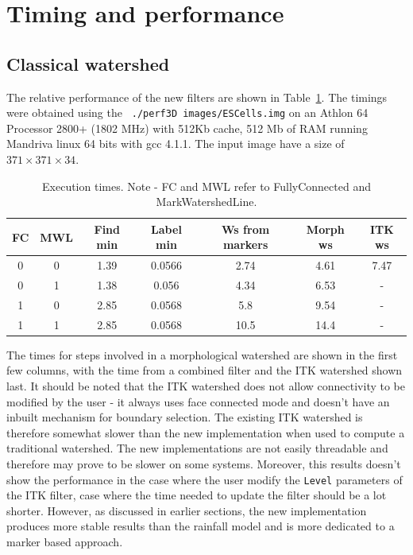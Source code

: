 \documentclass{InsightArticle}
\begin{document}
\section{Timing and performance}
\label{sect:perf}

  \subsection{Classical watershed}
\label{sect:perf-classical}

The relative performance of the new filters are shown in
Table~\ref{tbl:perf}. The timings were obtained using the {\tt
./perf3D images/ESCells.img} on an Athlon 64 
Processor 2800+ (1802 MHz) with 512Kb cache, 512 Mb of RAM running
Mandriva linux 64 bits with gcc 4.1.1. The input image have a size of
$371 \times 371 \times 34$.

\begin{table}[htbp]
\centering
\begin{tabular}{cc|ccc|cc}
\hline
FC & MWL & Find min &  Label min & Ws from markers & Morph ws &  ITK ws \\
\hline
\hline
0 &      0 &      1.39 &   0.0566 & 2.74 &   4.61 &   7.47 \\
0 &      1 &      1.38 &   0.056  & 4.34 &   6.53 &   - \\
1 &      0 &      2.85 &   0.0568 & 5.8  &   9.54 &   - \\
1 &      1 &      2.85 &   0.0568 & 10.5 &   14.4 &   - \\
\hline
\end{tabular}
\caption{Execution times. Note - FC and MWL refer to FullyConnected and MarkWatershedLine.\label{tbl:perf}}
\end{table}

The times for steps involved in a
morphological watershed are shown in the first few columns, with the
time from a combined filter and the ITK watershed shown last. It
should be noted that the ITK watershed does not allow connectivity to
be modified by the user - it always uses face connected mode and
doesn't have an inbuilt mechanism for boundary selection. The existing
ITK watershed is therefore somewhat slower than the new implementation
when used to compute a traditional watershed. The new implementations
are not easily threadable and therefore may prove to be slower on some
systems. Moreover, this results doesn't show the performance in the
case where the user modify the \verb$Level$ parameters of the ITK
filter, case where the time needed to update the filter should be a lot
shorter. However, as discussed in earlier sections, the new
implementation produces more stable results than the rainfall model
and is more dedicated to a marker based approach.
\end{document}
